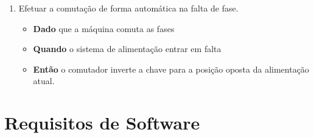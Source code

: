 \begin{enumerate}
				\begin{enumerate}
					\item Efetuar a comutação de forma automática na falta de fase.
						\begin{itemize}
							\item \textbf{Dado} que a máquina comuta as fases
							\item \textbf{Quando} o sistema de alimentação entrar em falta
							\item \textbf{Então} o comutador inverte a chave para a posição oposta da alimentação 
							atual.
						\end{itemize}
				\end{enumerate}
		\end{enumerate}

	\section[Requisitos de Software]{Requisitos de Software}


